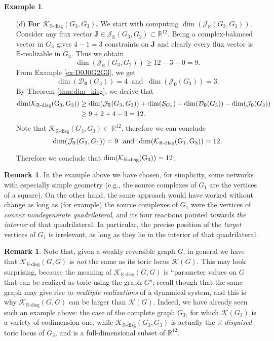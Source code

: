 \documentclass[11pt]{article}
\theoremstyle{plain}
\theoremstyle{definition}
\newtheorem{example}[theorem]{Example}
\newtheorem{remark}[theorem]{Remark}
\theoremstyle{remark}
\newcommand\RR{\mathbb{R}}
\newcommand\bJ{\boldsymbol{J}}
\newcommand{\mK}{\mathcal{K}}
\newcommand{\dK}{\mathcal{K}_{\RR\text{-disg}}}
\newcommand{\mJ}{\mathcal{J}_{\RR}}
\newcommand{\eJ}{\mathcal{J}_{\textbf{0}}}
\newcommand{\mD}{\mathcal{D}_{\textbf{0}}}
\begin{document}
\begin{example}
\begin{enumerate}
\item[(d)] \textbf{For $\dK(G_3, G_3)$.}
We start with computing $\dim (\mJ(G_3, G_3))$.
Consider any flux vector $\bJ \in \mJ(G_3, G_2) \subset \RR^{12}$.
Being a complex-balanced vector in $G_3$ gives $4-1=3$ constraints on $\bJ$ and clearly every flux vector is $\RR$-realizable in $G_3$.
Thus we obtain 
\[
\dim (\mJ(G_3, G_2)) \geq 12 - 3 - 0 = 9.
\]
From Example \ref{ex:D0J0G2G3}, we get 
\[
\dim (\mD (G_3)) = 4
\ \text{ and } \
\dim (\eJ(G_3)) =  3.
\]
By Theorem \ref{thm:dim_kisg}, we derive that
\begin{equation}
\begin{split} \notag
\rm{dim}(\dK(G_3, G_3)) 
& \geq \dim (\mJ(G_3, G_3)) + \dim (\mathcal{S}_{G_3}) + \dim(\mD (G_3)) - \dim(\eJ (G_3)) 
\\& \geq 9 + 2 + 4 - 3 = 12.
\end{split}
\end{equation}
Note that $\dK(G_3, G_3) \subset \RR^{12}$, therefore we can conclude
\[
\dim (\mJ(G_3, G_1)) = 9
\ \text{ and } \
\rm{dim}(\dK(G_1, G_3)) = 12.
\]

Therefore we conclude that $\rm{dim}(\dK(G_3)) = 12$.

\end{enumerate}
\end{example}




\begin{remark}
    In the example above we have chosen, for simplicity, some networks with especially simple geometry (e.g., the source complexes of $G_1$ are the vertices of a square). On the other hand,  the same approach would have worked without change as long as (for example) the source complexes of $G_1$ were the vertices of {\em convex nondegenerate quadrilateral}, and its four reactions pointed towards {\em the interior} of that quadrilateral. In particular, the precise position of the {\em target} vertices  of $G_1$ is irrelevant, as long as they lie in the interior of that quadrilateral.
\end{remark}
    


\begin{remark}
Note that, given a weakly reversible graph $G$, in general we have that $\dK(G, G)$ is {\em not} the same as its toric locus $\mK(G)$. This may look surprising, because the meaning of $\dK(G, G)$ is ``parameter values on $G$ that can be realized as toric using the graph $G$"; recall though that the same graph may give rise to {\em multiple realizations} of a dynamical system, and this is why $\dK(G, G)$ can be larger than $\mK(G)$. Indeed, we have already seen such an example above: the case of the complete graph $G_3$, for which $\mK(G_3)$ is a variety of codimension one, while $\dK(G_3, G_3)$ is actually the {\em $\RR$-disguised} toric locus of $G_3$, and is a full-dimensional subset of $\RR^{12}$. 
\end{remark}
\end{document}
